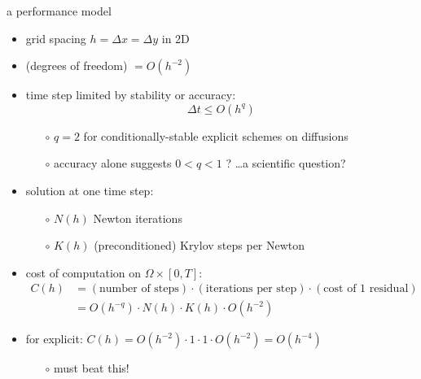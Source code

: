\documentclass[hide notes,intlimits,usenames,dvipsnames]{beamer}
\begin{document}
\begin{frame}{a performance model}

\begin{itemize}
\item grid spacing $h=\Delta x = \Delta y$ in 2D
\item (degrees of freedom) $=O(h^{-2})$ 
\item time step limited by stability or accuracy:
    $$\Delta t \le O(h^q)$$

\vspace{-3mm}
    \begin{itemize}
    \item[$\circ$] $q=2$ for conditionally-stable explicit schemes on diffusions
    \item[$\circ$] accuracy alone suggests $0<q<1$ ? \dots a scientific question?
    \end{itemize}
\item solution at one time step:
    \begin{itemize}
    \item[$\circ$] $N(h)$ Newton iterations
    \item[$\circ$] $K(h)$ (preconditioned) Krylov steps per Newton
    \end{itemize}
\item cost of computation on $\Omega \times [0,T]$:
\footnotesize
\begin{align*}
C(h) &= (\text{number of steps}) \cdot (\text{iterations per step}) \cdot (\text{cost of 1 residual}) \\
  &= O(h^{-q}) \cdot N(h) \cdot K(h) \cdot O(h^{-2})
\end{align*}
\normalsize
\item for explicit: $C(h) = O(h^{-2}) \cdot 1 \cdot 1 \cdot O(h^{-2}) = O(h^{-4})$
    \begin{itemize}
    \item[$\circ$] must beat this!
    \end{itemize}
\end{itemize}
\end{frame}
\end{document}
